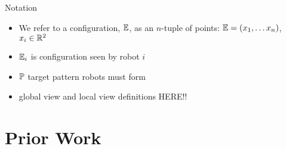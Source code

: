 \documentclass{beamer}
\begin{document}
\begin{frame}{Notation}
	\begin{itemize}
		\item We refer to a configuration, $\mathbb{E}$, as an $n$-tuple of points: $\mathbb{E} = (x_1,\ldots x_n)$, $x_i \in \mathbb{R}^2$
		\item $\mathbb{E}_i$ is configuration seen by robot $i$
		\item $\mathbb{P}$ target pattern robots must form
		\item global view and local view definitions HERE!! %
	\end{itemize}
\end{frame}

\section{Prior Work} 
\end{document}
